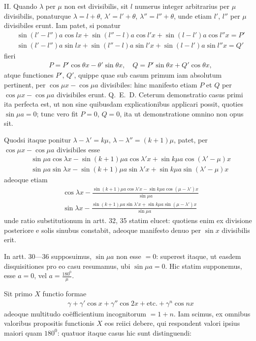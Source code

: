 II. Quando $\lambda$ per $\mu$ non est divisibilis, sit $l$ numerus integer arbitrarius per $\mu$ divisibilis, ponaturque $\lambda=l+\theta$, $\lambda'=l'+\theta$, $\lambda''=l''+\theta$, unde etiam $l'$, $l''$ per $\mu$ divisibiles erunt. Iam patet, si ponatur
\[
\begin{aligned}
&\sin(l'-l'')a\cos lx+\sin(l''-l)a\cos l'x+\sin(l-l')a\cos l''x=P'\\[5pt]
&\sin(l'-l'')a\sin lx+\sin(l''-l)a\sin l'x+\sin(l-l')a\sin l''x=Q'
\end{aligned}
\]
fieri
\[
\begin{aligned}
&P=P'\cos\theta x-\theta'\sin\theta x,\quad Q=P'\sin\theta x+Q'\cos\theta x,
\end{aligned}
\]
atque functiones $P'$, $Q'$, quippe quae sub casum primum iam absolutum pertinent, per $\cos\mu x-\cos\mu a$ divisibiles: hinc manifesto etiam $P$ et $Q$ per $\cos\mu x-\cos\mu a$ divisibiles erunt. Q.~E.~D. Ceterum demonstratio casus primi ita perfecta est, ut non sine quibusdam explicationibus applicari possit, quoties $\sin\mu a=0$; tunc vero fit $P=0$, $Q=0$, ita ut demonstratione omnino non opus sit.

Quodsi itaque ponitur $\lambda-\lambda'=k\mu$, $\lambda-\lambda''=(k+1)\mu$, patet, per $\cos\mu x-\cos\mu a$ divisibiles esse
\[
\begin{aligned}
&\sin\mu a\cos\lambda x-\sin(k+1)\mu a\cos\lambda'x+\sin k\mu a\cos(\lambda'-\mu)x\\[5pt]
&\sin\mu a\sin\lambda x-\sin(k+1)\mu a\sin\lambda'x+\sin k\mu a\sin(\lambda'-\mu)x
\end{aligned}
\]
adeoque etiam
\[
\begin{aligned}
&\displaystyle\cos\lambda x-\frac{\sin(k+1)\mu a\cos\lambda'x-\sin k\mu a\cos(\mu-\lambda')x}{\sin\mu a}\\[5pt]
&\displaystyle\sin\lambda x-\frac{\sin(k+1)\mu a\sin\lambda'x+\sin k\mu a\sin(\mu-\lambda')x}{\sin\mu a}
\end{aligned}
\]
unde ratio substitutionum in artt. 32, 35 statim elucet: quotiens enim ex divisione posteriore e solis sinubus constabit, adeoque manifesto denuo per $\sin x$ divisibilis erit.


In artt. 30---36 supposuimus, $\sin\mu a$ non esse $=0$: superest itaque, ut easdem disquisitiones pro eo casu resumamus, ubi $\sin\mu a=0$. Hic statim supponemus, esse $a=0$, vel $a=\frac{180^{\mathord{0}}}{\mu}$.
\par Sit primo $X$ functio formae
\[
\begin{aligned}
&\gamma+\gamma'\cos x+\gamma''\cos2x+\mathrm{etc.}+\gamma^n\cos nx
\end{aligned}
\]
adeoque multitudo coëfficientium incognitorum $=1+n$. Iam scimus, ex omnibus valoribus propositis functionis $X$ eos reiici debere, qui respondent valori ipsius maiori quam $180^{\mathord{0}}$: quatuor itaque casus hic sunt distinguendi:

